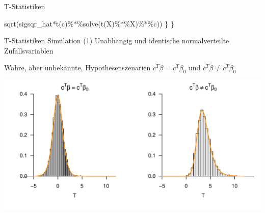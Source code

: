 \documentclass[
  8pt,
  ignorenonframetext,
]{beamer}
\newenvironment{Shaded}{\begin{snugshade}}{\end{snugshade}}
\newcommand{\FunctionTok}[1]{\textcolor[rgb]{0.00,0.00,0.00}{#1}}
\newcommand{\NormalTok}[1]{#1}
\newcommand{\SpecialCharTok}[1]{\textcolor[rgb]{0.00,0.00,0.00}{#1}}
\begin{document}
\begin{frame}[fragile]{T-Statistiken}
\begin{Shaded}
\begin{Highlighting}[]
                  \FunctionTok{sqrt}\NormalTok{(sigsqr\_hat}\SpecialCharTok{*}\FunctionTok{t}\NormalTok{(c)}\SpecialCharTok{\%*\%}\FunctionTok{solve}\NormalTok{(}\FunctionTok{t}\NormalTok{(X)}\SpecialCharTok{\%*\%}\NormalTok{X)}\SpecialCharTok{\%*\%}\NormalTok{c))}
\NormalTok{  \}}
\NormalTok{\}}
\end{Highlighting}
\end{Shaded}
\end{frame}

\begin{frame}{T-Statistiken}
\protect\hypertarget{t-statistiken-5}{}
Simulation (1) Unabhängig und identische normalverteilte
Zufallsvariablen

\footnotesize

Wahre, aber unbekannte, Hypothesenszenarien \(c^T\beta = c^T\beta_0\)
und \(c^T\beta \neq c^T\beta_0\)

\vspace{8mm}

\begin{center}\includegraphics[width=1\linewidth]{7_Abbildungen/alm_7_T_Teststatistik_1} \end{center}
\end{frame}
\end{document}
